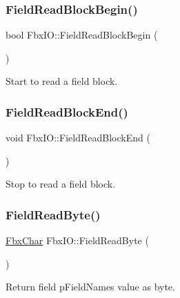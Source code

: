 \subsubsection{\texorpdfstring{Field\+Read\+Block\+Begin()}{FieldReadBlockBegin()}}
{\footnotesize\ttfamily bool Fbx\+I\+O\+::\+Field\+Read\+Block\+Begin (\begin{DoxyParamCaption}{ }\end{DoxyParamCaption})}



Start to read a field block. 

\mbox{\label{class_fbx_i_o_ac7d112e960624dbcdf4fb5445516b214}} 
\subsubsection{\texorpdfstring{Field\+Read\+Block\+End()}{FieldReadBlockEnd()}}
{\footnotesize\ttfamily void Fbx\+I\+O\+::\+Field\+Read\+Block\+End (\begin{DoxyParamCaption}{ }\end{DoxyParamCaption})}



Stop to read a field block. 

\mbox{\label{class_fbx_i_o_abd7cb1faa265a6c4e9438a99fd44aa8b}} 
\subsubsection{\texorpdfstring{Field\+Read\+Byte()}{FieldReadByte()}\hspace{0.1cm}{\footnotesize\ttfamily [1/2]}}
{\footnotesize\ttfamily \hyperlink{fbxtypes_8h_a34067dfe395a7cf3040b7b263c9024d2}{Fbx\+Char} Fbx\+I\+O\+::\+Field\+Read\+Byte (\begin{DoxyParamCaption}{ }\end{DoxyParamCaption})}



Return field p\+Field\+Name\textquotesingle{}s value as byte. 

\mbox{\label{class_fbx_i_o_af225dfcf4a2eafdbf9053a96cd0bc360}} 
